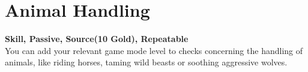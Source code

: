 \section{Animal Handling}\label{sec:animalHandling}
\textbf{Skill, Passive, Source(10 Gold), Repeatable}\\
You can add your relevant game mode level to checks concerning the handling of animals, like riding horses, taming wild beasts or soothing aggressive wolves.